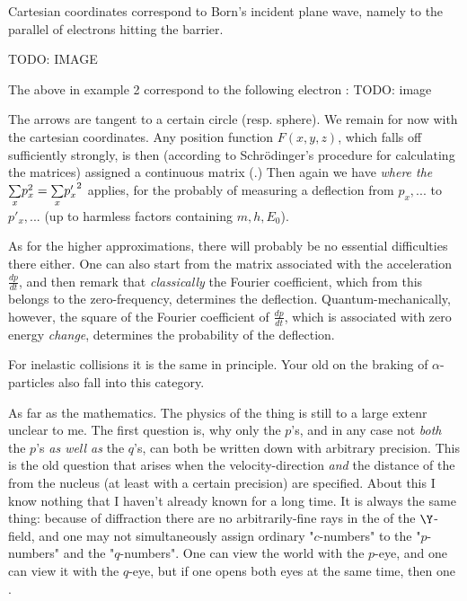 Cartesian coordinates correspond to Born's incident plane wave, namely to the parallel  of electrons hitting the barrier.

TODO: IMAGE

The above  in example 2 correspond to the following electron :
TODO: image

The arrows are tangent to a certain circle (resp. sphere). We remain for now with the cartesian coordinates. Any position function $F(x,y,z)$, which falls off sufficiently strongly, is then (according to Schr\"odinger's procedure for calculating the matrices) assigned a continuous matrix
(.) Then again we have
\textit{where the } $\underset{x}{\sum}{
p_x^2} = \underset{x}{\sum}{{p'_x}^2}$ applies, for the probably of measuring a deflection from $p_x,...$ to $p'_x,...$ (up to harmless factors containing $m,h,E_0$).

As for the higher approximations, there will probably be no essential difficulties there either. One can also start from the matrix associated with the acceleration $\frac{dp}{dt}$, and then remark that \textit{classically} the Fourier coefficient, which from this belongs to the zero-frequency,
determines the deflection. Quantum-mechanically, however, the square of the Fourier coefficient of $\frac{dp}{dt}$, which is associated with zero energy \textit{change}, determines the probability of the deflection.

For inelastic collisions it is the same in principle. Your old  on the braking of $\alpha$-particles also fall into this category.

As far as the mathematics. The physics of the thing is still to a large extenr unclear to me. The first question is, why only the $p$'s, and in any case not \textit{both} the $p$'s \textit{as well as} the $q$'s, can both be written down with arbitrary precision. This is the old question that arises when the velocity-direction \textit{and} the distance of the  from the nucleus (at least with a certain precision) are specified. About this I know nothing that I haven't already known for a long time. It is always the same thing: because of diffraction there are no arbitrarily-fine rays in the  of the $\Y$-field, and one may not simultaneously assign ordinary "$c$-numbers" to the "$p$-numbers" and the "$q$-numbers". One can view the world with the $p$-eye, and one can view it with the $q$-eye, but if one opens both eyes at the same time, then one .

